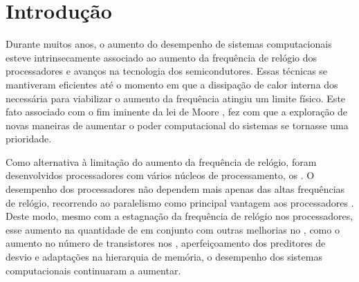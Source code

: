 \glsresetall

\chapter{Introdução}
\label{chap.intro}

Durante muitos anos, o aumento do desempenho de sistemas computacionais esteve intrinsecamente associado ao aumento da frequência de relógio dos processadores e avanços na tecnologia dos semicondutores. Essas técnicas se mantiveram eficientes até o momento em que a dissipação de calor interna dos \chips necessária para viabilizar o aumento da frequência atingiu um limite físico. Este fato associado com o fim iminente da lei de Moore \cite{moore:1965}, fez com que a exploração de novas maneiras de aumentar o poder computacional do sistemas se tornasse uma prioridade.

Como alternativa à limitação do aumento da frequência de relógio, foram desenvolvidos processadores com vários núcleos de processamento, os \multicores. O desempenho dos processadores \multicore não dependem mais apenas das altas frequências de relógio, recorrendo ao paralelismo como principal vantagem aos processadores \singlecore. Deste modo, mesmo com a estagnação da frequência de relógio nos processadores, esse aumento na quantidade de \cores em conjunto com outras melhorias no \hardware, como o aumento no número de transistores nos \chips, aperfeiçoamento dos preditores de desvio e adaptações na hierarquia de memória, o desempenho dos sistemas computacionais continuaram a aumentar.


